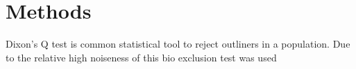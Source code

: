 \chapter{Methods}

Dixon's Q test is common statistical tool to reject outliners in a population. Due to the relative high noiseness of this bio exclusion test was used 